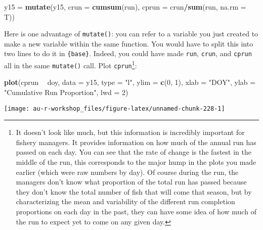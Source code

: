 \documentclass[]{book}
\newenvironment{Shaded}{\begin{snugshade}}{\end{snugshade}}
\newcommand{\KeywordTok}[1]{\textcolor[rgb]{0.13,0.29,0.53}{\textbf{#1}}}
\newcommand{\DataTypeTok}[1]{\textcolor[rgb]{0.13,0.29,0.53}{#1}}
\newcommand{\DecValTok}[1]{\textcolor[rgb]{0.00,0.00,0.81}{#1}}
\newcommand{\StringTok}[1]{\textcolor[rgb]{0.31,0.60,0.02}{#1}}
\newcommand{\OperatorTok}[1]{\textcolor[rgb]{0.81,0.36,0.00}{\textbf{#1}}}
\newcommand{\NormalTok}[1]{#1}
\let\rmarkdownfootnote\footnote%
\def\footnote{\protect\rmarkdownfootnote}
\theoremstyle{definition}
\theoremstyle{definition}
\theoremstyle{definition}
\theoremstyle{remark}
\begin{document}
\begin{Shaded}
\begin{Highlighting}[]
\NormalTok{y15 =}\StringTok{ }\KeywordTok{mutate}\NormalTok{(y15, }\DataTypeTok{crun =} \KeywordTok{cumsum}\NormalTok{(run), }\DataTypeTok{cprun =}\NormalTok{ crun}\OperatorTok{/}\KeywordTok{sum}\NormalTok{(run, }\DataTypeTok{na.rm =}\NormalTok{ T))}
\end{Highlighting}
\end{Shaded}

Here is one advantage of \texttt{mutate()}: you can refer to a variable
you just created to make a new variable within the same function. You
would have to split this into two lines to do it in \texttt{\{base\}}.
Indeed, you could have made \texttt{run}, \texttt{crun}, and
\texttt{cprun} all in the same \texttt{mutate()} call. Plot
\texttt{cprun}\footnote{It doesn't look like much, but this information
  is incredibly important for fishery managers. It provides information
  on how much of the annual run has passed on each day. You can see that
  the rate of change is the fastest in the middle of the run, this
  corresponds to the major hump in the plots you made earlier (which
  were raw numbers by day). Of course during the run, the managers don't
  know what proportion of the total run has passed because they don't
  know the total number of fish that will come that season, but by
  characterizing the mean and variability of the different run
  completion proportions on each day in the past, they can have some
  idea of how much of the run to expect yet to come on any given day.}:

\begin{Shaded}
\begin{Highlighting}[]
\KeywordTok{plot}\NormalTok{(cprun }\OperatorTok{~}\StringTok{ }\NormalTok{doy, }\DataTypeTok{data =}\NormalTok{ y15, }\DataTypeTok{type =} \StringTok{"l"}\NormalTok{, }\DataTypeTok{ylim =} \KeywordTok{c}\NormalTok{(}\DecValTok{0}\NormalTok{, }\DecValTok{1}\NormalTok{),}
     \DataTypeTok{xlab =} \StringTok{"DOY"}\NormalTok{, }\DataTypeTok{ylab =} \StringTok{"Cumulative Run Proportion"}\NormalTok{, }\DataTypeTok{lwd =} \DecValTok{2}\NormalTok{)}
\end{Highlighting}
\end{Shaded}

\begin{center}\texttt{[image: au-r-workshop\_files/figure-latex/unnamed-chunk-228-1]} \end{center}
\end{document}
